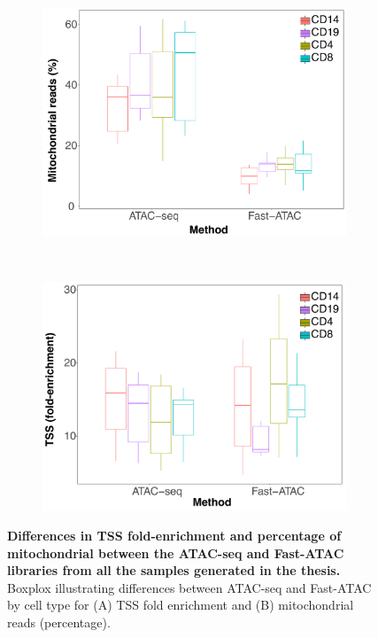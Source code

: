 \bigskip
\begin{figure}[t]
	\centering
	\begin{subfigure}[b]{0.48\textwidth}
		\centering 
		\includegraphics[width=\textwidth]{./Appendix/pdfs/Chapter3/ATAC_all_samples_MT_by_method_and_cell_type}
		\caption{}
	\end{subfigure}%
	~
	\begin{subfigure}[b]{0.48\textwidth} 
		\centering
		\includegraphics[width=\textwidth]{./Appendix/pdfs/Chapter3/ATAC_all_samples_TSS_by_method_and_cell_type}%
		\caption{}
	\end{subfigure}
	\caption[Differences in TSS fold-enrichment and percentage of mitochondrial between the ATAC-seq and Fast-ATAC libraries from all the samples generated in the thesis.]{\textbf{Differences in TSS fold-enrichment and percentage of mitochondrial between the ATAC-seq and Fast-ATAC libraries from all the samples generated in the thesis.} Boxplox illustrating differences between ATAC-seq and Fast-ATAC by cell type for (A) TSS fold enrichment and (B) mitochondrial reads (percentage).}
	\label{figure:Comparison_ATACseq_vs_fastATAC_all_thesis_samples}
\end{figure}




